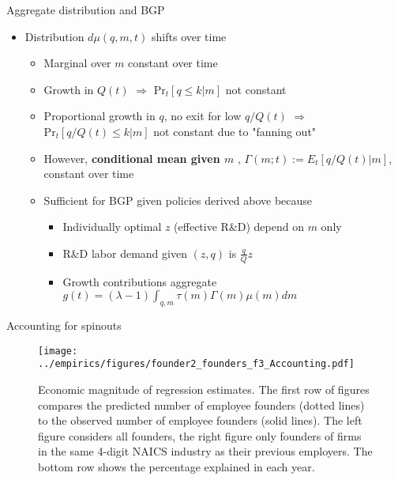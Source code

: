 \documentclass[english,usenames,dvipsnames]{beamer}
\begin{document}
\begin{frame}{Aggregate distribution and BGP}\label{aggregate_distribution_and_bgp}
\hyperlink{closing_the_model}{}
\begin{itemize}
\item Distribution $d\mu(q,m,t)$ shifts over time
\begin{itemize}
\item Marginal over $m$ constant over time
\item Growth in $Q(t)$ $\Rightarrow$ $\textrm{Pr}_t[q \le k | m]$ not constant
\item Proportional growth in $q$, no exit for low $q/Q(t)$ $\Rightarrow$ $\textrm{Pr}_t[q /Q(t)\le k | m]$ not constant due to "fanning out"
\item However, \textbf{\alert{conditional mean given $m$}} , $\Gamma(m;t) := E_t[q/Q(t) | m]$, constant over time
\item Sufficient for BGP given policies derived above because
\begin{itemize}
\item Individually optimal $z$ (effective R\&D) depend on $m$ only
\item R\&D labor demand given $(z,q)$ is $\frac{q}{Q}z$
\item Growth contributions aggregate $g(t) = (\lambda -1)\int_{q,m} \tau(m) \Gamma(m) \mu(m) dm$
\end{itemize}
\end{itemize}
\end{itemize}
\end{frame}


\begin{frame}{Accounting for spinouts}\label{regs_economic_significance}
\hyperlink{calibration_targets}{}
\begin{figure}[!htb]
	\texttt{[image: ../empirics/figures/founder2\_founders\_f3\_Accounting.pdf]}
	\caption{\tiny Economic magnitude of regression estimates. The first row of figures compares the predicted number of employee founders (dotted lines) to the observed number of employee founders (solid lines). The left figure considers all founders, the right figure only founders of firms in the same 4-digit NAICS industry as their previous employers. The bottom row shows the percentage explained in each year.}
\end{figure}
\end{frame}
\end{document}
